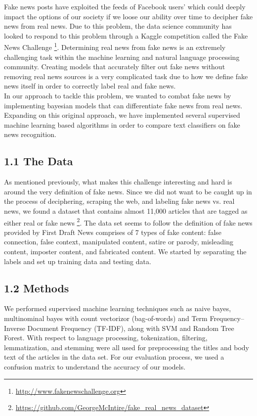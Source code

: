 \documentclass{neu_handout}
\begin{document}
Fake news posts have exploited the feeds of Facebook users' which could deeply impact the options of our society if we loose our ability over time to decipher fake news from real news. Due to this problem, the data science community has looked to respond to this problem through a Kaggle competition called the Fake News Challenge \footnote{\url{http://www.fakenewschallenge.org}}. Determining real news from fake news is an extremely challenging task within the machine learning and natural language processing community. Creating models that accurately filter out fake news without removing real news sources is a very complicated task due to how we define fake news itself in order to correctly label real and fake news. 
\\
In our approach to tackle this problem, we wanted to combat fake news by implementing bayesian models that can differentiate fake news from real news. Expanding on this original approach, we have implemented several supervised machine learning based algorithms in order to compare text classifiers on fake news recognition. 


\subsection*{1.1 The Data}
As mentioned previously, what makes this challenge interesting and hard is around the very definition of fake news. Since we did not want to be caught up in the process of deciphering, scraping the web, and labeling fake news vs. real news, we found a dataset that contains almost 11,000 articles that are tagged as either real or fake news \footnote{\url{https://github.com/GeorgeMcIntire/fake_real_news_dataset}}. The data set seems to follow the definition of fake news provided by First Draft News comprises of 7 types of fake content: false connection, false context, manipulated content, satire or parody, misleading content, imposter content, and fabricated content. We started by separating the labels and set up training data and testing data.


\subsection*{1.2 Methods}
We performed supervised machine learning techniques such as naive bayes, multinominal bayes with count vectorizor (bag-of-words) and Term Frequency–Inverse Document Frequency (TF-IDF), along with SVM and Random Tree Forest. With respect to language processing, tokenization, filtering, lemmatization, and stemming were all used for preprocessing the titles and body text of the articles in the data set. For our evaluation process, we used a confusion matrix to understand the accuracy of our models.
\end{document}
